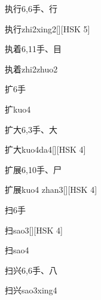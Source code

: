 \begin{entry}{执行}{6,6}{⼿、⾏}
  \begin{phonetics}{执行}{zhi2xing2}[][HSK 5]
  \end{phonetics}
\end{entry}

\begin{entry}{执着}{6,11}{⼿、⽬}
  \begin{phonetics}{执着}{zhi2zhuo2}
  \end{phonetics}
\end{entry}

\begin{entry}{扩}{6}{⼿}
  \begin{phonetics}{扩}{kuo4}
  \end{phonetics}
\end{entry}

\begin{entry}{扩大}{6,3}{⼿、⼤}
  \begin{phonetics}{扩大}{kuo4da4}[][HSK 4]
  \end{phonetics}
\end{entry}

\begin{entry}{扩展}{6,10}{⼿、⼫}
  \begin{phonetics}{扩展}{kuo4 zhan3}[][HSK 4]
  \end{phonetics}
\end{entry}

\begin{entry}{扫}{6}{⼿}
  \begin{phonetics}{扫}{sao3}[][HSK 4]
  \end{phonetics}
  \begin{phonetics}{扫}{sao4}
  \end{phonetics}
\end{entry}

\begin{entry}{扫兴}{6,6}{⼿、⼋}
  \begin{phonetics}{扫兴}{sao3xing4}
  \end{phonetics}
\end{entry}

